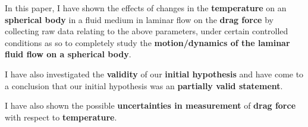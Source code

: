 {In this paper, I have shown the effects of changes in the \textbf{temperature} on an \textbf{spherical body} in a fluid medium in laminar flow on the \textbf{drag force} by collecting raw data relating to the above parameters, under certain controlled conditions as so to completely study the \textbf{motion/dynamics of the laminar fluid flow on a spherical body}.}

{I have also investigated the \textbf{validity} of our \textbf{initial hypothesis} and have come to a conclusion that our initial hypothesis was an \textbf{partially valid statement}.}

{I have also shown the possible \textbf{uncertainties in measurement} of \textbf{drag force} with respect to \textbf{temperature}.}

